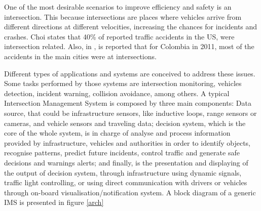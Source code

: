 One of the most desirable scenarios to improve efficiency and safety is an intersection. This because intersections are places where vehicles arrive from different directions at different velocities, increasing the chances for incidents and crashes. Choi \cite{Choi2010} states that 40\% of reported traffic accidents in the US, were intersection related. Also, in  \cite{CorporacionFondodePrevencionVial2010}, is reported that for Colombia in 2011, most of the accidents in the main cities were at intersections.

%


Different types of applications and systems are conceived to address these issues. Some tasks performed by those systems are intersection monitoring, vehicles detection, incident warning, collision avoidance, among others. A typical Intersection Management System is composed by three main components: Data source, that could be infrastructure sensors, like inductive loops, range sensors or cameras, and vehicle sensors and traveling data; decision system, which is the core of the whole system, is in charge of analyse and process information provided by infrastructure, vehicles and authorities in order to identify objects, recognise patterns, predict future incidents, control traffic and generate safe decisions and warnings alerts; and finally, is the presentation and displaying of the output of decision system, through infrastructure using dynamic signals, traffic light controlling, or using direct communication with drivers or vehicles through on-board visualisation/notification system. A block diagram of a generic IMS is presented in figure \ref{arch}

